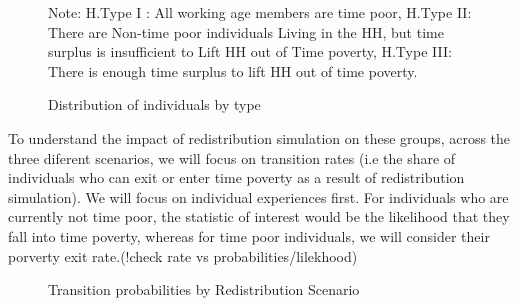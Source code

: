 \documentclass[
  11pt,
]{article}
\begin{document}
\begin{figure}[H]
{\begin{figure}[H]
\begin{minipage}{0.50\linewidth}
{}


\end{minipage}%

\end{figure}%

\footnotesize 

\begin{flushleft}Note: H.Type I : All working age members are time poor, H.Type II: There are Non-time poor individuals Living in the HH, but time surplus is insufficient to Lift HH out of Time poverty, H.Type III: There is enough time surplus to lift HH out of time poverty.\end{flushleft}

}

\caption{\label{fig-dist}Distribution of individuals by type}

\end{figure}%

To understand the impact of redistribution simulation on these groups,
across the three diferent scenarios, we will focus on transition rates
(i.e the share of individuals who can exit or enter time poverty as a
result of redistribution simulation). We will focus on individual
experiences first. For individuals who are currently not time poor, the
statistic of interest would be the likelihood that they fall into time
poverty, whereas for time poor individuals, we will consider their
porverty exit rate.(!check rate vs probabilities/lilekhood)

\begin{figure}[H]


\caption{\label{fig-transition1}Transition probabilities by
Redistribution Scenario}

\end{figure}%
\end{document}
